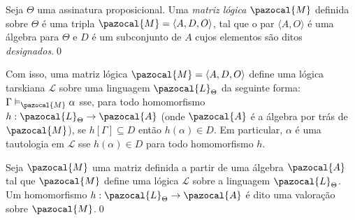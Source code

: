         \begin{definicao}
            Seja $\Theta$ uma assinatura proposicional. Uma \textit{matriz lógica} $\pazocal{M}$ definida sobre $\Theta$ é uma tripla $\pazocal{M} = \langle A, D, O \rangle$, tal que o par $\langle A, O \rangle$ é uma álgebra para $\Theta$ e $D$ é um subconjunto de $A$ cujos elementos são ditos \textit{designados}.\qed{}
        \end{definicao}

        Com isso, uma matriz lógica $\pazocal{M} = \langle A, D, O \rangle$ define uma lógica tarskiana $\mathcal{L}$ sobre uma linguagem $\pazocal{L}_{\Theta}$ da seguinte forma: $\Gamma \vDash_{\pazocal{M}} \alpha$ sse, para todo homomorfismo $h : \pazocal{L}_{\Theta} \rightarrow \pazocal{A}$ (onde $\pazocal{A}$ é a álgebra por trás de $\pazocal{M}$), se $h[\Gamma] \subseteq D$ então $h(\alpha) \in D$. Em particular, $\alpha$ é uma tautologia em $\mathcal{L}$ sse $h(\alpha) \in D$ para todo homomorfismo $h$.

        \begin{definicao}[Valoração]
            Seja $\pazocal{M}$ uma matriz definida a partir de uma álgebra $\pazocal{A}$ tal que $\pazocal{M}$ define uma lógica $\mathcal{L}$ sobre a linguagem $\pazocal{L}_{\Theta}$. Um homomorfismo $h : \pazocal{L}_{\Theta} \rightarrow \pazocal{A}$ é dito uma valoração sobre $\pazocal{M}$.\qed{}
        \end{definicao}



